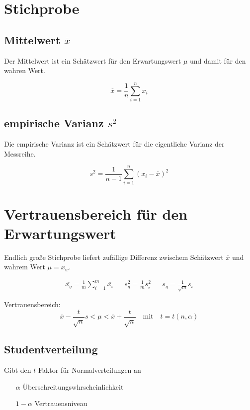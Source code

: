 \newpage
\section{Stichprobe}
\begin{multicols}{2}
	\subsection{Mittelwert \texorpdfstring{$\overline{x}$}{}}
	Der Mittelwert ist ein Schätzwert für den Erwartungswert \(\mu\) und damit für
	den wahren Wert.

	\[\overline{x} = \frac{1}{n} \sum_{i = 1}^{n} x_i\]
	
	\subsection{empirische Varianz \texorpdfstring{$s^2$}{}}
	Die empirische Varianz ist ein Schätzwert für die eigentliche Varianz der
	Messreihe.

	\[s^2 = \frac{1}{n-1} \sum_{i = 1}^{n} \left(x_i - \overline{x}\right)^2\]
	
	\vfill	
\end{multicols}

\section{Vertrauensbereich für den Erwartungswert}
Endlich große Stichprobe liefert zufällige Differenz zwischem Schätzwert
\(\overline{x}\) und wahrem Wert \(\mu=x_w\).

\begin{alignat*}{3}
	\overline{x_g} = \frac{1}{m}\sum_{i = 1}^{m}\overline{x_i} && s_{g}^2 =
	\frac{1}{m}s_{i}^2 && s_g = \frac{1}{\sqrt{m}}s_i
\end{alignat*}

Vertrauensbereich:
\[
\overline{x} - \frac{t}{\sqrt{n}} s < \mu < \overline{x} + \frac{t}{\sqrt{n}} \quad
\text{mit} \quad t = t\left( n, \alpha \right)
\]

\subsection{Studentverteilung}
Gibt den \(t\) Faktor für Normalverteilungen an
\begin{itemize}
  \item [\(\alpha\)] Überschreitungswhrscheinlichkeit
  \item [\(1 - \alpha\)] Vertrauensniveau
\end{itemize} 

